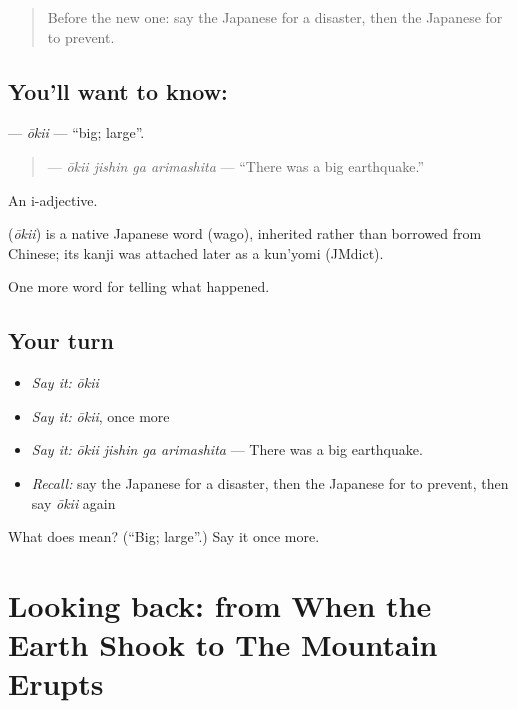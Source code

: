 \begin{quote}
Before the new one: say the Japanese for a disaster, then the Japanese for to prevent.
\end{quote}

\subsection*{You'll want to know: }
\textbf{} — \emph{ōkii} — \textquotedblleft{}big; large\textquotedblright{}.

\begin{quote}
\textbf{  } — \emph{ōkii jishin ga arimashita} — \textquotedblleft{}There was a big earthquake.\textquotedblright{}
\end{quote}

An i-adjective.

\begin{cousinweb}
\textbf{} (\emph{ōkii}) is a native Japanese word (wago), inherited rather than borrowed from Chinese; its kanji was attached later as a kun'yomi (JMdict).
\end{cousinweb}

\begin{grammarlens}[title={What you've built}]
One more word for telling what happened.
\end{grammarlens}

\subsection*{Your turn}
\begin{itemize}
\raggedright
  \item \emph{Say it:} \emph{ōkii}
  \item \emph{Say it:} \emph{ōkii}, once more
  \item \emph{Say it:} \emph{ōkii jishin ga arimashita} — There was a big earthquake.
  \item \emph{Recall:} say the Japanese for a disaster, then the Japanese for to prevent, then say \emph{ōkii} again
\end{itemize}

\begin{tcolorbox}[breakable,colback=teal!4,colframe=teal!35!black,title={Before you move on}]
What does  mean? (\textquotedblleft{}Big; large\textquotedblright{}.) Say it once more.
\end{tcolorbox}
\section[(dialogue)]{Looking back: from When the Earth Shook to The Mountain Erupts}

